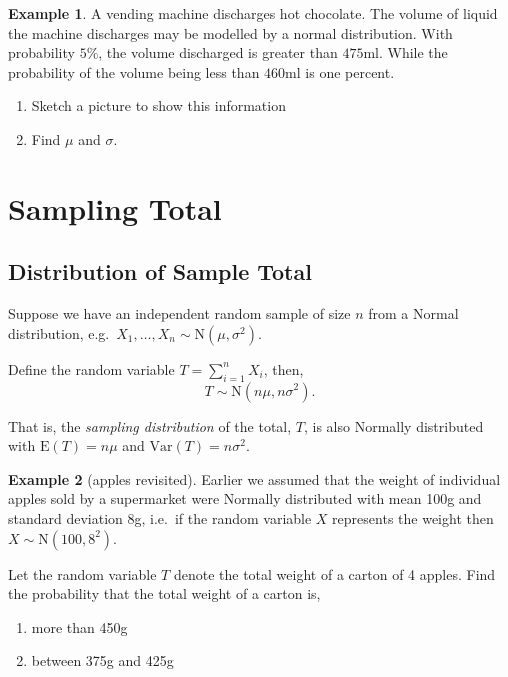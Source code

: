 \documentclass[
]{book}
\theoremstyle{definition}
\theoremstyle{definition}
\newtheorem{example}{Example}[chapter]
\theoremstyle{definition}
\theoremstyle{definition}
\theoremstyle{remark}
\begin{document}
\begin{example}

A vending machine discharges hot chocolate. The volume of liquid the machine discharges may be modelled by a normal distribution. With probability \(5\%\), the volume discharged is greater than \(475\)ml. While the probability of the volume being less than \(460\)ml is one percent.

\begin{enumerate}
\def\labelenumi{\alph{enumi})}
\item
  Sketch a picture to show this information
\item
  Find \(\mu\) and \(\sigma\).
\end{enumerate}

\end{example}

\hypertarget{sampling-total}{%
\section{Sampling Total}\label{sampling-total}}

\subsection{Distribution of Sample Total}

Suppose we have an independent random sample of size \(n\) from a Normal distribution,
e.g.~\(X_1,\ldots,X_n\sim \text{N}(\mu,\sigma^2)\).

Define the random variable \(T=\sum_{i=1}^n X_i\), then,
\[ T \sim \text{N}(n\mu,n\sigma^2). \]

That is, the \emph{sampling distribution} of the total, \(T\), is also Normally distributed with \(\text{E}(T)=n\mu\) and \(\text{Var}(T)=n\sigma^2\).

\begin{example}[apples revisited]

Earlier we assumed that the weight of
individual apples sold by a supermarket were Normally distributed
with mean 100g and standard deviation 8g, i.e.~if the random variable \(X\)
represents the weight then \(X \sim \text{N}(100,{8^2})\).

Let the random variable \(T\) denote the total weight of a carton of 4 apples. Find the probability that the total weight of a carton is,

\begin{enumerate}
\def\labelenumi{\alph{enumi})}
\item
  more than 450g
\item
  between 375g and 425g
\end{enumerate}

\end{example}
\end{document}
